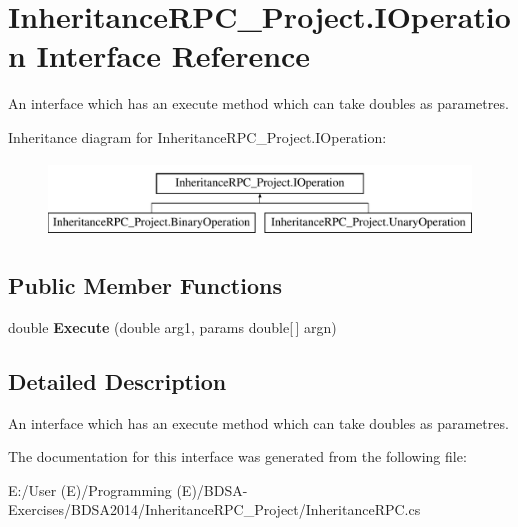 \hypertarget{interface_inheritance_r_p_c___project_1_1_i_operation}{\section{Inheritance\+R\+P\+C\+\_\+\+Project.\+I\+Operation Interface Reference}
\label{interface_inheritance_r_p_c___project_1_1_i_operation}
}


An interface which has an execute method which can take doubles as parametres.  


Inheritance diagram for Inheritance\+R\+P\+C\+\_\+\+Project.\+I\+Operation\+:\begin{figure}[H]
\begin{center}
\leavevmode
\includegraphics[height=2.000000cm]{interface_inheritance_r_p_c___project_1_1_i_operation}
\end{center}
\end{figure}
\subsection*{Public Member Functions}
\begin{DoxyCompactItemize}
\item 
\hypertarget{interface_inheritance_r_p_c___project_1_1_i_operation_abcab2f8bc2367a44c05e5244a1fea4eb}{double {\bfseries Execute} (double arg1, params double\mbox{[}$\,$\mbox{]} argn)}\label{interface_inheritance_r_p_c___project_1_1_i_operation_abcab2f8bc2367a44c05e5244a1fea4eb}

\end{DoxyCompactItemize}


\subsection{Detailed Description}
An interface which has an execute method which can take doubles as parametres. 



The documentation for this interface was generated from the following file\+:\begin{DoxyCompactItemize}
\item 
E\+:/\+User (\+E)/\+Programming (\+E)/\+B\+D\+S\+A-\/\+Exercises/\+B\+D\+S\+A2014/\+Inheritance\+R\+P\+C\+\_\+\+Project/Inheritance\+R\+P\+C.\+cs\end{DoxyCompactItemize}
